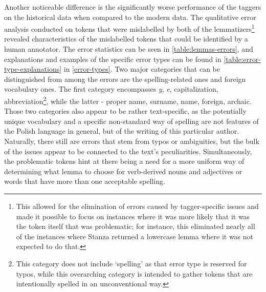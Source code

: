 Another noticeable difference is the significantly worse performance of the taggers on the historical data when compared to the modern data. The qualitative error analysis conducted on tokens that were mislabelled by both of the lemmatizers\footnote{This allowed for the elimination of errors caused by tagger-specific issues and made it possible to focus on instances where it was more likely that it was the token itself that was problematic; for instance, this eliminated nearly all of the instances where Stanza returned a lowercase lemma where it was not expected to do that.} revealed characteristics of the mislabelled tokens that could be identified by a human annotator. The error statistics can be seen in \autoref{table:lemmas-errors}, and explanations and examples of the specific error types can be found in \autoref{table:error-type-explanations} in \autoref{error-types}. Two major categories that can be distinguished from among the errors are the spelling-related ones and foreign vocabulary ones. The first category encompasses \textit{y}, \textit{e}, capitalization, abbreviation\footnote{This category does not include `spelling' as that error type is reserved for typos, while this overarching category is intended to gather tokens that are intentionally spelled in an unconventional way.}, while the latter - proper name, surname, name, foreign, archaic. Those two categories also appear to be rather text-specific, as the potentially unique vocabulary and a specific non-standard way of spelling are not features of the Polish language in general, but of the writing of this particular author. Naturally, there still are errors that stem from typos or ambiguities, but the bulk of the issues appear to be connected to the text's peculiarities. Simultaneously, the problematic tokens hint at there being a need for a more uniform way of determining what lemma to choose for verb-derived nouns and adjectives or words that have more than one acceptable spelling.

